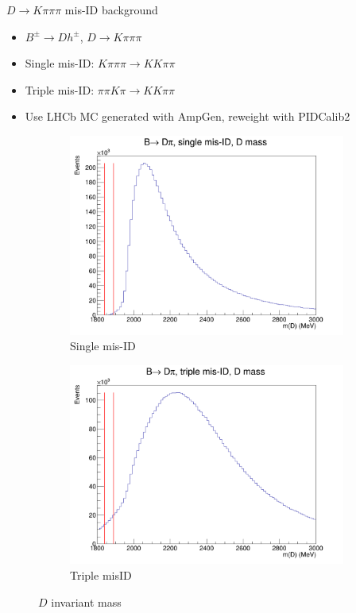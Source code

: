 \documentclass{beamer}
\begin{document}
\begin{frame}{$D\to K\pi\pi\pi$ mis-ID background}
  \begin{itemize}
    \setlength\itemsep{0.5em}
    \item{$B^\pm\to Dh^\pm$, $D\to K\pi\pi\pi$}
    \item{Single mis-ID: $K\pi\pi\pi\to KK\pi\pi$}
    \item{Triple mis-ID: $\pi\pi K\pi\to KK\pi\pi$}
    \item{Use LHCb MC generated with AmpGen, reweight with PIDCalib2}
  \end{itemize}
  \begin{figure}
    \centering
    \begin{subfigure}{0.45\textwidth}
      \includegraphics[width = 1.0\textwidth]{Plots/Kpipipi_SingleMisID_Dpi_DMass.png}
      \caption{Single mis-ID}
    \end{subfigure}%
    \begin{subfigure}{0.45\textwidth}
      \includegraphics[width = 1.0\textwidth]{Plots/Kpipipi_TripleMisID_Dpi_DMass.png}
      \caption{Triple misID}
    \end{subfigure}
    \caption{$D$ invariant mass}
  \end{figure}
\end{frame}
\end{document}
